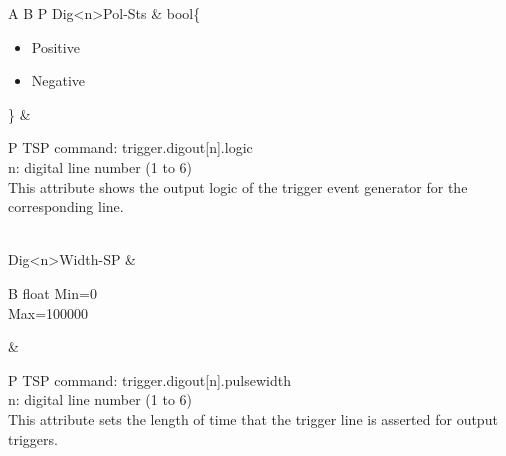 \documentclass[openany]{article}
\begin{document}
\begin{longtable}{A B P}
		Dig{\textless n\textgreater}Pol-Sts & bool\{\begin{itemize}[noitemsep]
					\small
					\item[] Positive
					\item[] Negative
				\end{itemize}\} & 
				\begin{tabular}{P}
					TSP command: trigger.digout[n].logic \\
					n: digital line number (1 to 6) \\
					This attribute shows the output logic of the trigger event generator for the corresponding line.
				\end{tabular} \\ \hline
		Dig{\textless n\textgreater}Width-SP & \begin{tabular}{B}
					float
					Min=0 \\
					Max=100000 
				\end{tabular} & 
				\begin{tabular}{P}
					TSP command: trigger.digout[n].pulsewidth \\
					n: digital line number (1 to 6) \\
					This attribute sets the length of time that the trigger line is asserted for output triggers.
				\end{tabular} \\


\end{longtable}
\end{document}
